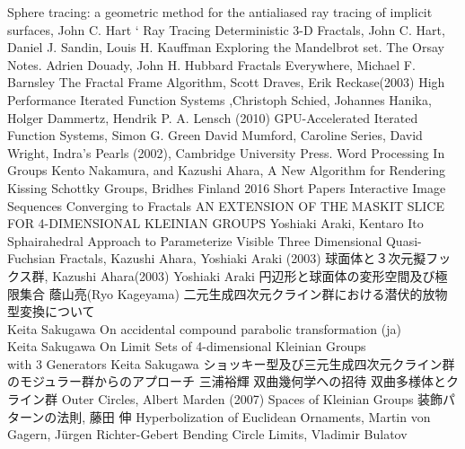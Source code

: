 {
\setlength{\baselineskip}{13pt}
\begin{thebibliography}{99}

        Sphere tracing: a geometric method for the antialiased ray tracing of implicit surfaces, John C. Hart
`
         Ray Tracing Deterministic 3-D Fractals,
         John C. Hart, Daniel J. Sandin, Louis H. Kauffman
         Exploring the Mandelbrot set. The Orsay Notes.
         Adrien Douady, John H. Hubbard
         Fractals Everywhere, Michael F. Barnsley
        The Fractal Frame Algorithm, Scott Draves, Erik Reckase(2003)
         High Performance Iterated Function Systems
         ,Christoph Schied, Johannes Hanika, Holger Dammertz, Hendrik P. A. Lensch (2010)
         GPU-Accelerated Iterated Function Systems,
         Simon G. Green
         David Mumford, Caroline Series, David Wright, Indra's Pearls
         (2002), Cambridge University Press.
         Word Processing In Groups
         Kento Nakamura, and Kazushi Ahara, A New Algorithm for
         Rendering Kissing Schottky Groups,
         Bridhes Finland 2016 Short Papers
        Interactive Image Sequences Converging to Fractals
        AN EXTENSION OF THE MASKIT SLICE FOR 4-DIMENSIONAL KLEINIAN GROUPS
        Yoshiaki Araki, Kentaro Ito
        Sphairahedral Approach to Parameterize Visible Three Dimensional Quasi-Fuchsian Fractals,
        Kazushi Ahara, Yoshiaki Araki (2003)
        球面体と３次元擬フックス群,
        Kazushi Ahara(2003)
        Yoshiaki Araki
        円辺形と球面体の変形空間及び極限集合
        蔭山亮(Ryo Kageyama)
        二元生成四次元クライン群における潜伏的放物型変換について\\
        Keita Sakugawa
        On accidental compound parabolic transformation (ja)\\
        Keita Sakugawa
        On Limit Sets of 4-dimensional Kleinian Groups\\
with 3 Generators
        Keita Sakugawa
        ショッキー型及び三元生成四次元クライン群のモジュラー群からのアプローチ
        三浦裕輝
        双曲幾何学への招待
        双曲多様体とクライン群
        Outer Circles, Albert Marden (2007)
        Spaces of Kleinian Groups
        装飾パターンの法則,
        藤田 伸
        Hyperbolization of Euclidean Ornaments,
        Martin von Gagern, Jürgen Richter-Gebert
        Bending Circle Limits,
        Vladimir Bulatov
\end{thebibliography}
}
